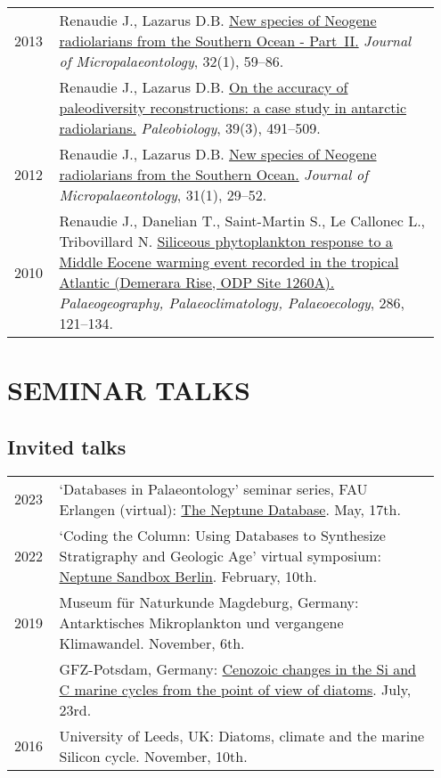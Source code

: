 \documentclass[11pt, a4paper]{article}
\begin{document}
\begin{longtable}{@{}p{0.1\linewidth} >{\small}P{0.85\linewidth}@{}}
2013 & Renaudie J., Lazarus D.B. \href{http://dx.doi.org/10.1144/jmpaleo2011-025}{New species of Neogene radiolarians from the Southern Ocean - Part II.} \textit{Journal of Micropalaeontology}, 32(1), 59--86.\\
    & Renaudie J., Lazarus D.B. \href{http://dx.doi.org/10.1666/12016}{On the accuracy of paleodiversity reconstructions: a case study in antarctic radiolarians.} \textit{Paleobiology}, 39(3), 491--509.\\
2012 & Renaudie J., Lazarus D.B. \href{http://dx.doi.org/10.1144/0262-821X10-026}{New species of Neogene radiolarians from the Southern Ocean.} \textit{Journal of Micropalaeontology}, 31(1), 29--52.\\
2010 & Renaudie J., Danelian T., Saint-Martin S., Le Callonec L., Tribovillard N. \href{http://dx.doi.org/10.1016/j.palaeo.2009.12.004}{Siliceous phytoplankton response to a Middle Eocene warming event recorded in the tropical Atlantic (Demerara Rise, ODP Site 1260A).} \textit{Palaeogeography, Palaeoclimatology, Palaeoecology}, 286, 121--134.\\
\end{longtable}

\section{SEMINAR TALKS}
\subsection{Invited talks}
\begin{longtable}{@{}p{0.1\linewidth} >{\small}P{0.85\linewidth}@{}}
2023 & `Databases in Palaeontology' seminar series, FAU Erlangen (virtual): \href{https://www.youtube.com/watch?v=g8-W1U6LhVw}{The Neptune Database}. May, 17th.\\
2022 & `Coding the Column: Using Databases to Synthesize Stratigraphy and Geologic Age' virtual symposium: \href{https://plannapus.github.io/data/20220210CodingTheColumn.pdf}{Neptune Sandbox Berlin}. February, 10th.\\
2019 & Museum f\"{u}r Naturkunde Magdeburg, Germany: Antarktisches Mikroplankton und vergangene Klimawandel. November, 6th.\\
    & GFZ-Potsdam, Germany: \href{http://plannapus.github.io/data/20190723Potsdam.pdf}{Cenozoic changes in the Si and C marine cycles from the point of view of diatoms}. July, 23rd.\\
2016 & University of Leeds, UK: Diatoms, climate and the marine Silicon cycle. November, 10th.\\
\end{longtable}
\end{document}
